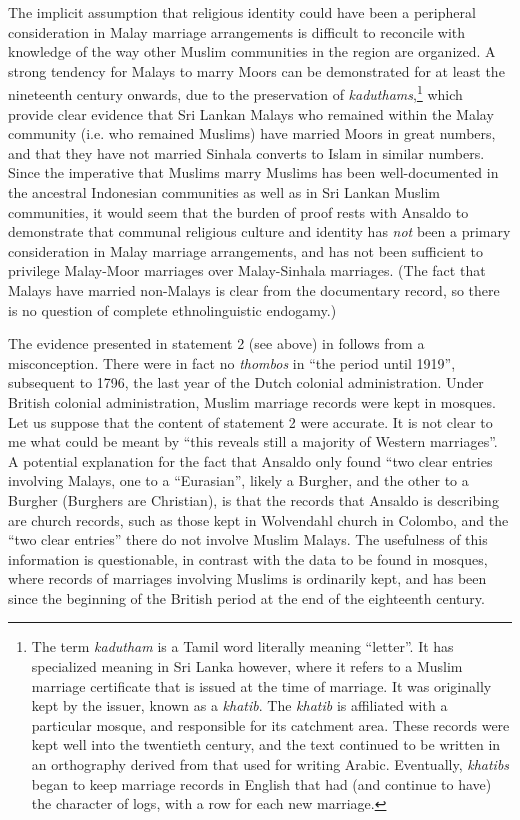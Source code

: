The implicit assumption that religious identity could have been a peripheral consideration in Malay marriage arrangements is difficult to reconcile with knowledge of the way other Muslim communities in the region are organized. A strong tendency for Malays to marry Moors can be demonstrated for at least the nineteenth century onwards, due to the preservation of \textit{kaduthams},\footnote{The
  term \textit{kadutham} is a Tamil word literally meaning ``letter''. It has specialized meaning in Sri Lanka however, where it refers to a Muslim marriage certificate that is issued at the time of marriage. It was originally kept by the issuer, known as a \textit{khatib}. The \textit{khatib} is affiliated with a particular mosque, and responsible for its catchment area. These records were kept well into the twentieth century, and the text continued to be written in an orthography derived from that used for writing Arabic. Eventually, \textit{khatibs} began to keep marriage records in English that had (and continue to have) the character of logs, with a row for each new marriage.
} 
which provide clear evidence that Sri Lankan Malays who remained within the Malay community (i.e. who remained Muslims) have married Moors in great numbers, and that they have not married Sinhala converts to Islam in similar numbers. Since the imperative that Muslims marry Muslims has been well-documented in the ancestral Indonesian communities as well as in Sri Lankan Muslim communities, it would seem that the burden of proof rests with Ansaldo to demonstrate that communal religious culture and identity has \textit{not} been a primary consideration in Malay marriage arrangements, and has not been sufficient to privilege Malay-Moor marriages over Malay-Sinhala marriages. (The fact that Malays have married non-Malays is clear from the documentary record, so there is no question of complete ethnolinguistic endogamy.)

The evidence presented in statement 2 (see above) in \citet{Ansaldo2008genesis} follows from a misconception. There were in fact no \textit{thombos} in ``the period until 1919'', subsequent to 1796, the last year of the Dutch colonial administration. Under British colonial administration, Muslim marriage records were kept in mosques. Let us suppose that the content of statement 2 were accurate. It is not clear to me what could be meant by ``this reveals still a majority of Western marriages''. A potential explanation for the fact that Ansaldo only found ``two clear entries involving Malays, one to a ``Eurasian'', likely a Burgher, and the other to a Burgher (Burghers are Christian), is that the records that Ansaldo is describing are church records, such as those kept in Wolvendahl church in Colombo, and the ``two clear entries'' there do not involve Muslim Malays. The usefulness of this information is questionable, in contrast with the data to be found in mosques, where records of marriages involving Muslims is ordinarily kept, and has been since the beginning of the British period at the end of the eighteenth century.


